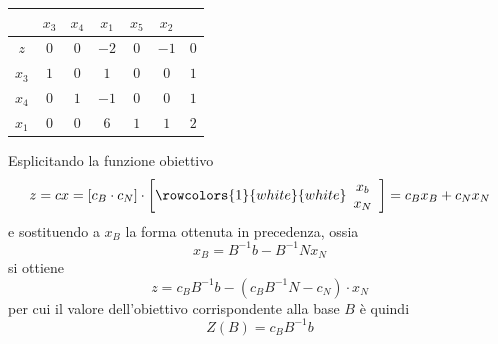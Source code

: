 \documentclass[a4paper]{extarticle}
\renewcommand\arraystretch{}
\begin{document}
\vspace{1em}
\noindent
\begin{table}[H]
    \setlength{\tabcolsep}{4pt}
    \renewcommand{\arraystretch}{1.2}
    \noindent
    \centering
    \begin{tabular}{|c|ccc|cc|c|}
        & $x_3$ & $x_4$ & $x_1$ & $x_5$ & $x_2$ &\\
        \hline
        $z$ & $0$ & $0$ & $-2$ & $0$ & $-1$ & $0$\\
        \hline
        $x_3$ & \cellcolor{red!50!white}$1$ & \cellcolor{red!50!white}$0$ & \cellcolor{red!50!white}$1$ & \cellcolor{blue!50!white}$0$ & \cellcolor{blue!50!white}$0$ & \cellcolor{orange!25!white}$1$\\
        $x_4$ & \cellcolor{red!50!white}$0$ & \cellcolor{red!50!white}$1$ & \cellcolor{red!50!white}$-1$ & \cellcolor{blue!50!white}$0$ & \cellcolor{blue!50!white}$0$ & \cellcolor{orange!25!white}$1$\\
        $x_1$ & \cellcolor{red!50!white}$0$ & \cellcolor{red!50!white}$0$ & \cellcolor{red!50!white}$6$ & \cellcolor{blue!50!white}$1$ & \cellcolor{blue!50!white}$1$ & \cellcolor{orange!25!white}$2$\\
        \hline
    \end{tabular}
\end{table}

\vspace{1em}
\noindent
Esplicitando la funzione obiettivo
\[z = c x = \left[c_B \cdot c_N\right] \cdot \left[
\rowcolors{1}{white}{white}
\begin{array}{c}
    x_b\\
    x_N
\end{array}
\right] = c_B x_B + c_N x_N 
\]
e sostituendo a $x_B$ la forma ottenuta in precedenza, ossia
\[x_B = B^{-1} b - B^{-1} N x_N\]
si ottiene
\[z=c_B B^{-1}b - \left(c_B B^{-1}N - c_N\right) \cdot x_N\]
per cui il valore dell'obiettivo corrispondente alla base $B$ è quindi
\[\boxed{Z(B) = c_B B^{-1} b}\]
\end{document}
